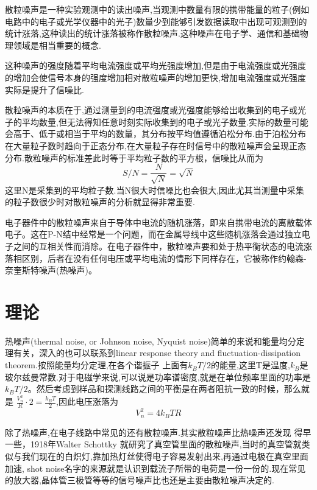 \documentclass[a4paper]{article}
\begin{document}
散粒噪声是一种实验观测中的读出噪声,当观测中数量有限的携带能量的粒子(例如电路中的电子或光学仪器中的光子)数量少到能够引发数据读取中出现可观测到的统计涨落,这种读出的统计涨落被称作散粒噪声.这种噪声在电子学、通信和基础物理领域是相当重要的概念.

这种噪声的强度随着平均电流强度或平均光强度增加,但是由于电流强度或光强度的增加会使信号本身的强度增加相对散粒噪声的增加更快,增加电流强度或光强度实际是提升了信噪比.

散粒噪声的本质在于,通过测量到的电流强度或光强度能够给出收集到的电子或光子的平均数量,但无法得知任意时刻实际收集到的电子或光子数量.实际的数量可能会高于、低于或相当于平均的数量，其分布按平均值遵循泊松分布.由于泊松分布在大量粒子数时趋向于正态分布,在大量粒子存在时信号中的散粒噪声会呈现正态分布.散粒噪声的标准差此时等于平均粒子数的平方根，信噪比从而为
\begin{equation}
    S/N=\frac{N}{\sqrt{N}}=\sqrt{N}
\end{equation}
这里N是采集到的平均粒子数.当N很大时信噪比也会很大,因此尤其当测量中采集的粒子数很少时对散粒噪声的分析就显得非常重要.

电子器件中的散粒噪声来自于导体中电流的随机涨落，即来自携带电流的离散载体电子。这在P-N结中经常是一个问题，而在金属导线中这些随机涨落会通过独立电子之间的互相关性而消除。在电子器件中，散粒噪声要和处于热平衡状态的电流涨落相区别，后者在没有任何电压或平均电流的情形下同样存在，它被称作约翰森-奈奎斯特噪声(热噪声)。
\newpage
\section{理论} \label{theory}%
热噪声(thermal noise, or Johnson noise, Nyquist noise)简单的来说和能量均分定理有关，深入的也可以联系到linear response theory and fluctuation-dissipation theorem.按照能量均分定理,在各个谐振子 上面有$k_B T/2$的能量,这里T是温度,$k_B$是玻尔兹曼常数.对于电磁学来说,可以说是功率谱密度,就是在单位频率里面的功率是$k_BT /2$。然后考虑到样品和探测线路之间的平衡是在两者阻抗一致的时候，那么就是
$\frac{V_n^2}{R}\cdot 2=\frac{k_B T}{2}$,因此电压涨落为
\begin{equation}
    V^2_n=4k_B TR
\end{equation}
    
除了热噪声,在电子线路中常见的还有散粒噪声.其实散粒噪声比热噪声还发现
得早一些，1918年Walter Schottky 就研究了真空管里面的散粒噪声,当时的真空管就类似与我们现在的白炽灯,靠加热灯丝使得电子容易发射出来,再通过电极在真空里面加速, shot noise名字的来源就是认识到载流子所带的电荷是一份一份的.现在常见的放大器,晶体管三极管等等的信号噪声比也还是主要由散粒噪声决定的.
\end{document}
